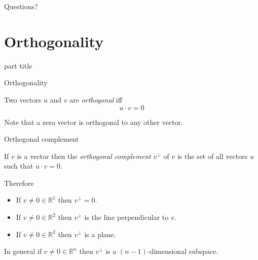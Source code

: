 \documentclass{beamer}
\begin{document}
\begin{frame}
  Questions?
\end{frame}

\section{Orthogonality}

\begin{frame}
  \begin{beamercolorbox}[sep=12pt,center]{part title}
    \insertsection\par
  \end{beamercolorbox}
\end{frame}

\begin{frame}{Orthogonality}
  \begin{definition}
    Two vectors $u$ and $v$ are \emph{orthogonal} iff
    \begin{equation*}
      u\cdot v = 0
    \end{equation*}
  \end{definition}\vfill
  Note that a zero vector is orthogonal to any other vector.
\end{frame}

\begin{frame}{Orthogonal complement}
  \begin{definition}
    If $v$ is a vector then the \emph{orthogonal complement $v^{\perp}$} of $v$ is the set of all vectors $u$ such that $u\cdot v = 0$.
  \end{definition}\vfill
  Therefore
  \begin{itemize}
  \item If $v\neq 0\in \mathbb R^1$ then $v^{\perp} = 0$.
  \item If $v\neq 0\in \mathbb R^2$ then $v^{\perp}$ is the line perpendicular to $v$.
  \item If $v\neq 0\in \mathbb R^2$ then $v^{\perp}$ is a plane.
  \end{itemize}\vfill
  In general if $v\neq 0 \in \mathbb R^n$ then $v^{\perp}$ is a $(n-1)$-dimensional subspace.
\end{frame}
\end{document}
